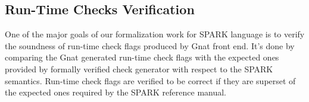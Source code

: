 \subsection{Run-Time Checks Verification}
One of the major goals of our formalization work for SPARK language is
to verify the soundness of run-time check flags produced by Gnat front
end. It's done by comparing the Gnat generated run-time check flags with the
expected ones provided by formally verified check generator with respect to the
SPARK semantics. Run-time check flags are verified to be correct if they are
superset of the expected ones required by the SPARK reference manual.











